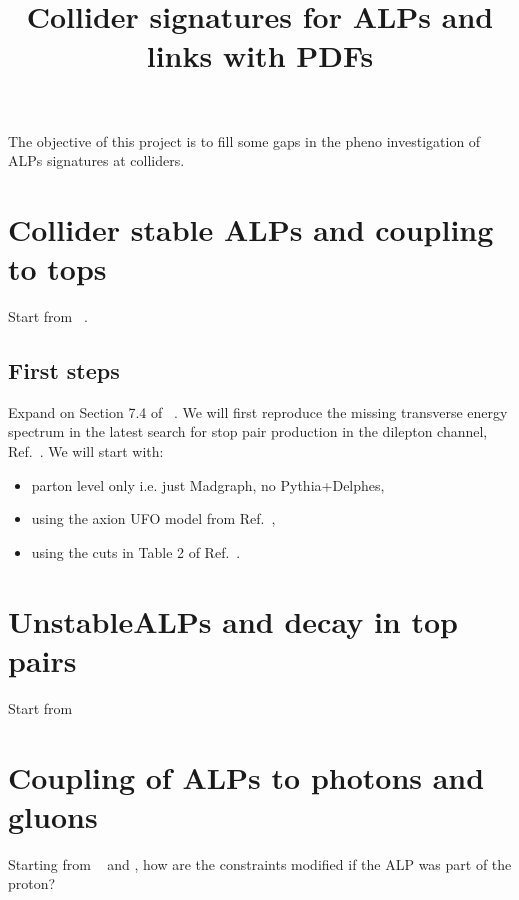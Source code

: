 \documentclass[11pt,a4paper]{article}
\title{Collider signatures for ALPs and links with PDFs}
\begin{document}
\maketitle

The objective of this project is to fill some gaps in the pheno investigation of ALPs signatures at colliders.

\section{Collider stable ALPs and coupling to tops}

Start from ~\cite{Brivio:2017ije}.

\subsection{First steps}
Expand on Section 7.4 of ~\cite{Brivio:2017ije}.
We will first reproduce the missing transverse energy spectrum in the latest search for stop pair production in
the dilepton channel, Ref.~\cite{ATLAS:2021hza}.
We will start with:
\begin{itemize}
	\item parton level only i.e. just Madgraph, no Pythia+Delphes,
	\item using the axion UFO model from Ref.~\cite{Brivio:2017ije},
	\item using the cuts in Table 2 of Ref.~\cite{ATLAS:2021hza}.
\end{itemize}



\section{UnstableALPs and decay in top pairs}
Start from ~\cite{Bonilla:2021ufe}

\section{Coupling of ALPs to photons and gluons}
Starting from ~\cite{Mimasu:2014nea} and \cite{Gavela:2019cmq}, how
are the constraints modified if the ALP was part of the proton?



\end{document}
